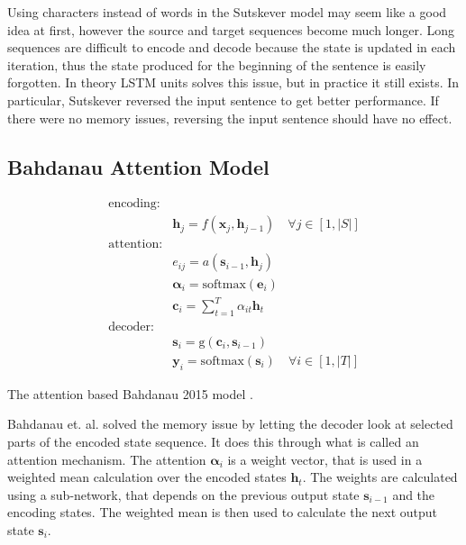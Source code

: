 Using characters instead of words in the Sutskever model may seem like a good idea at first, however the source and target sequences become much longer. Long sequences are difficult to encode and decode because the state is updated in each iteration, thus the state produced for the beginning of the sentence is easily forgotten. In theory LSTM units solves this issue, but in practice it still exists. In particular, Sutskever reversed the input sentence to get better performance. If there were no memory issues, reversing the input sentence should have no effect.

\subsection{Bahdanau Attention Model}
\label{sec:theory:sequential:bahdanau}

\begin{equationbox}[H]
\begin{equation*}
\begin{aligned}
\text{encoding:} & \\
& \mathbf{h}_j = f(\mathbf{x}_j, \mathbf{h}_{j-1}) \quad \forall j \in [1, |S|] \\
\text{attention:} & \\
& e_{ij} = a(\mathbf{s}_{i-1}, \mathbf{h}_j) \\
& \bm{\alpha}_i = \mathrm{softmax}(\mathbf{e}_i) \\
& \mathbf{c}_i = {\textstyle \sum_{t=1}^T} \alpha_{it} \mathbf{h}_t \\
\text{decoder:} & \\
&\mathbf{s}_i = \mathrm{g}(\mathbf{c}_i, \mathbf{s}_{i-1}) \\
&\mathbf{y}_i = \mathrm{softmax}(\mathbf{s}_i) \quad \forall i \in [1, |T|]
\end{aligned}
\end{equation*}
\caption{The attention based Bahdanau 2015 model \cite{bahdanau-2015-nmt}.}
\end{equationbox}

Bahdanau et. al. solved the memory issue by letting the decoder look at selected parts of the encoded state sequence. It does this through what is called an attention mechanism. The attention $\bm{\alpha}_i$ is a weight vector, that is used in a weighted mean calculation over the encoded states $\mathbf{h}_t$. The weights are calculated using a sub-network, that depends on the previous output state $\mathbf{s}_{i-1}$ and the encoding states. The weighted mean is then used to calculate the next output state $\mathbf{s}_{i}$.

